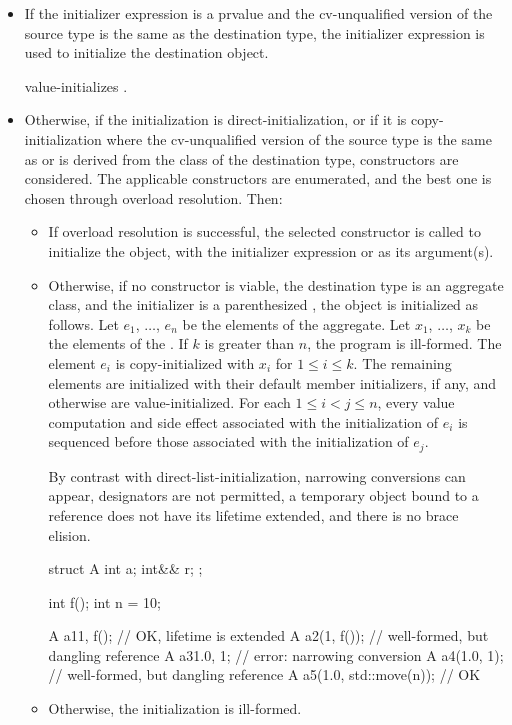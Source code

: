 \begin{itemize}
\begin{itemize}
\item
If the initializer expression is a prvalue
and the cv-unqualified version of the source type
is the same as the destination type,
the initializer expression is used to initialize the destination object.
\begin{example}
 value-initializes .
\end{example}
\item
Otherwise, if the initialization is direct-initialization,
or if it is copy-initialization where the cv-unqualified version of the source
type is the same as or is derived from the class of the destination type,
constructors are considered.
The applicable constructors
are enumerated, and the best one is chosen
through overload resolution. Then:
\begin{itemize}
\item
If overload resolution is successful,
the selected constructor
is called to initialize the object, with the initializer
expression or  as its argument(s).
\item
Otherwise, if no constructor is viable,
the destination type is
an aggregate class, and
the initializer is a parenthesized ,
the object is initialized as follows.
Let $e_1$, $\dotsc$, $e_n$ be the elements of the aggregate.
Let $x_1$, $\dotsc$, $x_k$ be the elements of the .
If $k$ is greater than $n$, the program is ill-formed.
The element $e_i$ is copy-initialized with
$x_i$ for $1 \leq i \leq k$.
The remaining elements are initialized with
their default member initializers, if any, and
otherwise are value-initialized.
For each $1 \leq i < j \leq n$,
every value computation and side effect
associated with the initialization of $e_i$
is sequenced before those associated with the initialization of $e_j$.
\begin{note}
By contrast with direct-list-initialization,
narrowing conversions can appear,
designators are not permitted,
a temporary object bound to a reference
does not have its lifetime extended, and
there is no brace elision.
\begin{example}
\begin{codeblock}
struct A {
  int a;
  int&& r;
};

int f();
int n = 10;

A a1{1, f()};                   // OK, lifetime is extended
A a2(1, f());                   // well-formed, but dangling reference
A a3{1.0, 1};                   // error: narrowing conversion
A a4(1.0, 1);                   // well-formed, but dangling reference
A a5(1.0, std::move(n));        // OK
\end{codeblock}
\end{example}
\end{note}
\item
Otherwise, the initialization is ill-formed.
\end{itemize}


\end{itemize}
\end{itemize}
